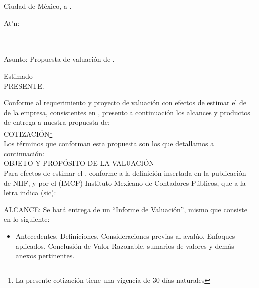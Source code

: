 \begin{flushright}
Ciudad de M\'exico, a \fechaCotizacion.
\end{flushright}
\vspace{2cm}

\begin{flushleft}
At'n: \nombreInteresado\\
\puesto\\
\nombreEmpresa\\[1cm]
\end{flushleft}

\begin{flushright}
Asunto: Propuesta de valuaci\'on de \tipoValuacion.\\[1cm]
\end{flushright}
Estimado \nombreInteresado\\
PRESENTE.



Conforme al requerimiento y proyecto de \textcolor{principal}{valuaci\'on} con efectos de estimar el  \proposito             
       de  \tipoValuacion  de la empresa, \propietario consistentes en \bienes, presento a continuaci\'on  los alcances y productos de entrega a nuestra propuesta de:\\[10pt]

\textcolor{principal}{ COTIZACI\'ON\footnote{La presente cotizaci\'on tiene una vigencia de 30 d\'ias naturales}}\\[10pt]

Los t\'erminos que conforman esta propuesta son los que detallamos a continuaci\'on:\\

\textcolor{principal}{OBJETO Y PROP\'OSITO DE LA VALUACI\'ON}\\

Para efectos de estimar el \textcolor{principal}{\proposito}, conforme a la definici\'on insertada en la publicaci\'on de NIIF, \textcolor{principal}{y por el (IMCP) Instituto Mexicano de Contadores P\'ublicos}, que a la letra indica (sic):\\[10pt]
\begin{center}
\begin{minipage}{13cm}

\end{minipage}
\end{center}

\textcolor{principal}{ALCANCE:} Se har\'a entrega de un \textcolor{principal}{``Informe de Valuaci\'on''}, mismo que consiste en lo siguiente:\\
	\begin{itemize}
		\item Antecedentes, Definiciones, Consideraciones previas al aval\'uo, Enfoques aplicados, Conclusi\'on de Valor Razonable, sumarios de valores y dem\'as anexos pertinentes.
	\end{itemize}
	
